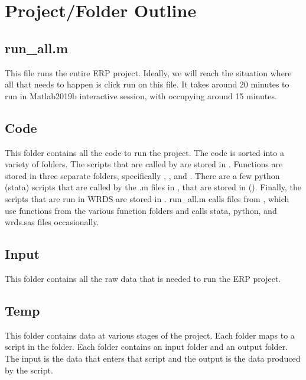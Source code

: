 \documentclass{article}
\begin{document}
	\section{Project/Folder Outline}
	
	\subsection{run\_all.m}
	
	This file runs the entire ERP project. Ideally, we will reach the situation where all that needs to happen is click run on this file. It takes around 20 minutes to run in Matlab2019b interactive session, with  occupying around 15 minutes. 
	
	\subsection{Code}
	
	This folder contains all the code to run the project. The code is sorted into a variety of folders. The scripts that are called by  are stored in . Functions are stored in three separate folders, specifically , , and . There are a few python (stata) scripts that are called by the .m files in , that are stored in  (). Finally, the scripts that are run in WRDS are stored in . run\_all.m calls files from , which use functions from the various function folders and calls stata, python, and wrds.sas files occasionally. 
	
	\subsection{Input}
	
	This folder contains all the raw data that is needed to run the ERP project. 
	
	\subsection{Temp}
	
	This folder contains data at various stages of the project. Each folder maps to a script in the  folder. Each folder contains an input folder and an output folder. The input is the data that enters that script and the output is the data produced by the script. 
	
\end{document}
